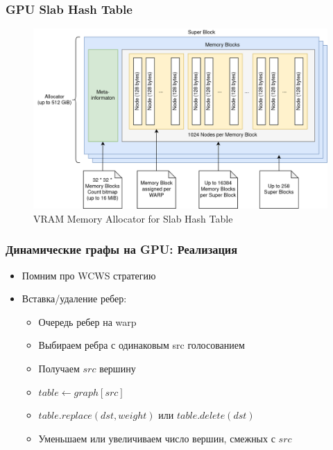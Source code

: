 \documentclass[xcolor=table,english]{beamer}
\begin{document}
\begin{frame}[fragile] \frametitle{GPU Slab Hash Table}
    \begin{minipage}[m]{0.95\linewidth}
        \begin{figure}
            \centering
            \includegraphics[width=\textwidth]{pictures/memory_allocator.png}
            \caption{VRAM Memory Allocator for Slab Hash Table}
            \label{fig:memory_allocator}
        \end{figure}
    \end{minipage}\hfill
\end{frame}

\begin{frame}[fragile] \frametitle{Динамические графы на GPU: Реализация}
    \begin{itemize}
        \item Помним про WCWS стратегию
        \item Вставка/удаление ребер:
        {
            \begin{itemize}
                \item Очередь ребер на warp
                \item Выбираем ребра с одинаковым src голосованием
                \item Получаем $src$ вершину
                \item $table \gets graph[src]$
                \item $table.replace(dst,weight)$ или $table.delete(dst)$
                \item Уменьшаем или увеличиваем число вершин, смежных с $src$
            \end{itemize}
        }
    \end{itemize}
\end{frame}
\end{document}
